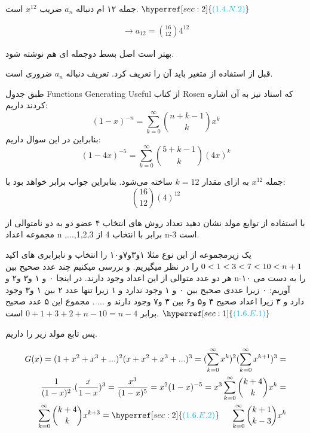 \documentclass[11pt,largemargins]{h2wp}
\begin{document}
    جمله ۱۲ ام دنباله 
    $ a_n$
  ضریب 
  $ x ^ {12} $
  است.
$ \hyperref[sec:2]{\textcolor{capri}{(1.4.N.2)}}  $

\begin{align*}
  \longrightarrow a_{12} = \binom{16}{12} 4 ^ {12}
\end{align*}



\notes

\Nnote
بهتر است اصل بسط دوجمله ای هم نوشته شود. \label{sec:1} 

\Nnote
قبل از استفاده از متغیر باید آن را تعریف کرد. تعریف دنباله $a_n$ ضروری است. \label{sec:2} 		



طبق جدول
  Functions Generating Useful
از کتاب Rosen
که استاد نیز به آن اشاره کردند داریم:\\
$$(1 - x) ^ {-n} = \sum_{k = 0}^{\infty} \binom{n + k - 1}{k} x^{k} $$
  بنابراین در این سوال داریم:
$$(1 - 4x) ^ {-5} =
\sum_{k = 0}^{\infty} \binom{5 + k - 1}{k} (4x)^k $$

جمله $x^{12}$ به ازای مقدار $k = 12$ ساخته می‌شود. بنابراین جواب برابر خواهد بود با: 
$$\binom{16}{12} (4)^{12}$$

\question

\question 
   با استفاده از توابع مولد نشان دهید تعداد روش های انتخاب ۴ عضو دو به دو  نامتوالی از مجموعه اعداد n
			 ,...,1,2,3
			 برابر با 
			 انتخاب 4 از n-3 است.
			 
\solution
یک زیرمجموعه از این نوع مثلا {۱و۳و۷و۱۰} را انتخاب و نابرابری های اکید 
    $ \\ 0 < 1 < 3 < 7 < 10 < n+1 \\ $ 
   را در نظر میگیریم. و بررسی میکنیم چند عدد صحیح بین هر دو عدد متوالی از این اعداد وجود دارند. در اینجا ۰ و ۱ و۳ و۲ و n-۱۰ 
   را به دست می آوریم: ۰ زیرا عددی صحیح بین ۰ و ۱ وجود ندارد و ۱ زیرا تنها عدد ۲ بین ۱ و۳ وجود دارد و ۳ زیرا اعداد صحیح ۴ و۵ و۶ بین ۳ و۷ وجود دارند و ... .
   مجموع این ۵ عدد صحیح برابر
   $ 0 + 1 + 3 + 2 + n-10 = n-4 $ 
     است.
     $ \hyperref[sec:1]{\textcolor{capri}{(1.6.E.1)}}  $
     
    پس تابع مولد زیر را داریم.
    
   \begin{align*}
   G(x) = ( 1 + x^2 + x^3 + ...)^2 (x + x^2 + x^3 + ...)^3 = ( \sum_{k = 0}^{\infty} x^k)^2 ( \sum_{k = 0}^{\infty} x^{k+1})^3 =\\ \frac{1}{(1-x)^2} . (\frac{x}{1-x})^3 = \frac{x^3 }{(1-x)^5} = x^2 (1-x)^{-5} = x^3 \sum_{k=0}^{\infty} \binom{k+4}{k} x ^ k =\\ \sum_{k=0}^{\infty} \binom{k+4}{k} x^{k+3} = \hyperref[sec:2]{\textcolor{capri}{(1.6.E.2)}}  \hspace{0.5 cm} \sum_{k=0}^{\infty}\binom{k+1}{k-3} x^k
\end{align*}    
      
\end{document}
